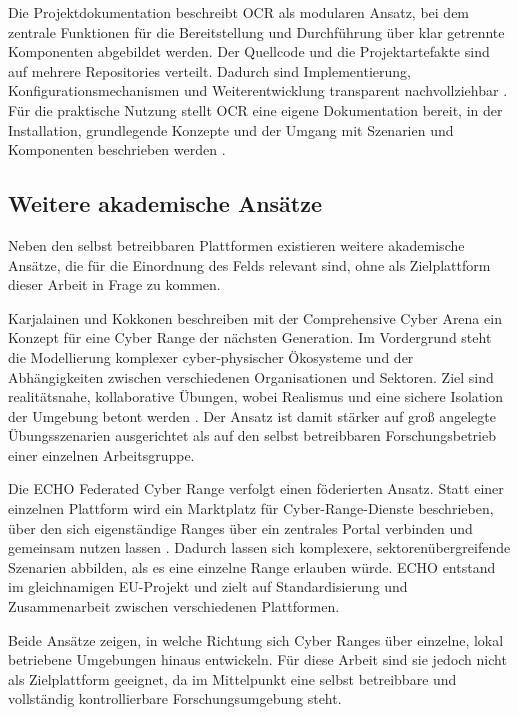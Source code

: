 Die Projektdokumentation beschreibt OCR als modularen Ansatz, bei dem zentrale Funktionen für die
Bereitstellung und Durchführung über klar getrennte Komponenten abgebildet werden. Der Quellcode
und die Projektartefakte sind auf mehrere Repositories verteilt. Dadurch sind Implementierung,
Konfigurationsmechanismen und Weiterentwicklung transparent nachvollziehbar \cite{OCRGitHub}. Für
die praktische Nutzung stellt OCR eine eigene Dokumentation bereit, in der Installation,
grundlegende Konzepte und der Umgang mit Szenarien und Komponenten beschrieben werden
\cite{OCRDocs}.

\subsection{Weitere akademische Ansätze}
\label{subsec:weitere-akademisch}

Neben den selbst betreibbaren Plattformen existieren weitere akademische Ansätze, die für die
Einordnung des Felds relevant sind, ohne als Zielplattform dieser Arbeit in Frage zu kommen.

Karjalainen und Kokkonen beschreiben mit der Comprehensive Cyber Arena ein Konzept für eine Cyber
Range der nächsten Generation. Im Vordergrund steht die Modellierung komplexer cyber-physischer
Ökosysteme und der Abhängigkeiten zwischen verschiedenen Organisationen und Sektoren. Ziel sind
realitätsnahe, kollaborative Übungen, wobei Realismus und eine sichere Isolation der Umgebung
betont werden \cite{KarjalainenCyberArena2020}. Der Ansatz ist damit stärker auf groß angelegte
Übungsszenarien ausgerichtet als auf den selbst betreibbaren Forschungsbetrieb einer einzelnen
Arbeitsgruppe.

Die ECHO Federated Cyber Range verfolgt einen föderierten Ansatz. Statt einer einzelnen Plattform
wird ein Marktplatz für Cyber-Range-Dienste beschrieben, über den sich eigenständige Ranges über
ein zentrales Portal verbinden und gemeinsam nutzen lassen \cite{OikonomouECHO2021}. Dadurch lassen
sich komplexere, sektorenübergreifende Szenarien abbilden, als es eine einzelne Range erlauben
würde. ECHO entstand im gleichnamigen EU-Projekt und zielt auf Standardisierung und Zusammenarbeit
zwischen verschiedenen Plattformen.

Beide Ansätze zeigen, in welche Richtung sich Cyber Ranges über einzelne, lokal betriebene
Umgebungen hinaus entwickeln. Für diese Arbeit sind sie jedoch nicht als Zielplattform geeignet, da
im Mittelpunkt eine selbst betreibbare und vollständig kontrollierbare Forschungsumgebung steht.


